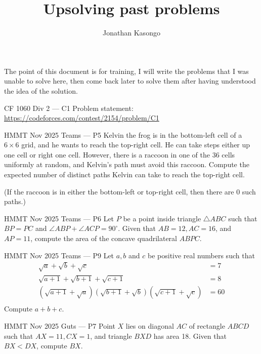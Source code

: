 \documentclass{article}
\author{Jonathan Kasongo}
\title{Upsolving past problems}
\begin{document}
\maketitle

The point of this document is for training, I will write the problems that
I was unable to solve here, then come back later to solve them after having
understood the idea of the solution.

\begin{problem}{CF 1060 Div 2 --- C1}
Problem statement:
\url{https://codeforces.com/contest/2154/problem/C1}
\end{problem}

\begin{problem}{HMMT Nov 2025 Teams --- P5}
Kelvin the frog is in the bottom-left cell of a $6 \times 6$ grid, and he
wants to reach the top-right cell.
He can take steps either up one cell or right one cell. However, there is a
raccoon in one of the 36 cells
uniformly at random, and Kelvin’s path must avoid this raccoon. Compute the
expected number of
distinct paths Kelvin can take to reach the top-right cell.
\vspace{0.2cm}

(If the raccoon is in either the bottom-left or top-right cell, then there
are 0 such paths.)
\end{problem}

\begin{problem}{HMMT Nov 2025 Teams --- P6}
Let $P$ be a point inside triangle $\triangle ABC$ such that $BP = PC$
and $\angle ABP + \angle ACP = 90^{\circ}$. Given
that $AB = 12, AC = 16$, and $AP = 11$, compute the area of the concave
quadrilateral $ABPC$.
\end{problem}

\begin{problem}{HMMT Nov 2025 Teams --- P9}
Let $a,b$ and $c$ be positive real numbers such that
\[
\begin{aligned}
\sqrt{a} + \sqrt{b} + \sqrt{c} &= 7\\
\sqrt{a+1} + \sqrt{b+1} + \sqrt{c+1} &= 8\\
(\sqrt{a+1} + \sqrt{a})(\sqrt{b+1} + \sqrt{b})(\sqrt{c+1} + \sqrt{c}) &= 60\\
\end{aligned}
\]
Compute $a+b+c$.
\end{problem}

\begin{problem}{HMMT Nov 2025 Guts --- P7}
Point $X$ lies on diagonal $AC$ of rectangle $ABCD$ such that
$AX = 11, CX = 1$, and triangle $BXD$
has area 18. Given that $BX < DX$, compute $BX$.
\end{problem}
\end{document}
